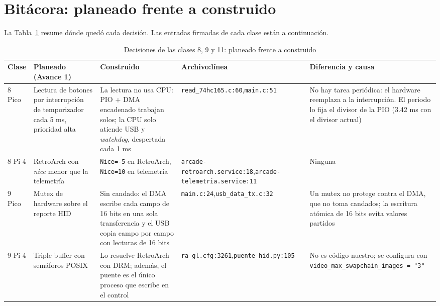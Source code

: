 \documentclass[conference]{IEEEtran}
\begin{document}

\section{Bitácora: planeado frente a construido}
La Tabla~\ref{tab:bitacora} resume dónde quedó cada decisión. Las entradas firmadas de cada clase están a continuación.

\begin{table}[!t]
	\centering
	\caption{Decisiones de las clases 8, 9 y 11: planeado frente a construido}
	\label{tab:bitacora}
	\footnotesize
	\begin{tabular}{|p{1.2cm}|p{3.6cm}|p{3.8cm}|p{3.2cm}|p{3.8cm}|}
		\hline
		\textbf{Clase} & \textbf{Planeado (Avance 1)} & \textbf{Construido} & \textbf{Archivo:línea} & \textbf{Diferencia y causa} \\
		\hline
		8 Pico & Lectura de botones por interrupción de temporizador cada 5 ms, prioridad alta & La lectura no usa CPU: PIO + DMA encadenado trabajan solos; la CPU solo atiende USB y \textit{watchdog}, despertada cada 1 ms & \texttt{read\_74hc165.c:60},\newline\texttt{main.c:51} & No hay tarea periódica: el hardware reemplaza a la interrupción. El periodo lo fija el divisor de la PIO (3.42 ms con el divisor actual) \\
		\hline
		8 Pi 4 & RetroArch con \textit{nice} menor que la telemetría & \texttt{Nice=-5} en RetroArch, \texttt{Nice=10} en telemetría & \texttt{arcade-\allowbreak retroarch.service:18},\newline\texttt{arcade-\allowbreak telemetria.service:11} & Ninguna \\
		\hline
		9 Pico & Mutex de hardware sobre el reporte HID & Sin candado: el DMA escribe cada campo de 16 bits en una sola transferencia y el USB copia campo por campo con lecturas de 16 bits & \texttt{main.c:24},\newline\texttt{usb\_data\_tx.c:32} & Un mutex no protege contra el DMA, que no toma candados; la escritura atómica de 16 bits evita valores partidos \\
		\hline
		9 Pi 4 & Triple buffer con semáforos POSIX & Lo resuelve RetroArch con DRM; además, el puente es el único proceso que escribe en el control & \texttt{ra\_gl.cfg:3261},\newline\texttt{puente\_hid.py:105} & No es código nuestro; se configura con \texttt{video\_max\_swapchain\_images = "3"} \\

\end{tabular}
\end{table}
\end{document}
